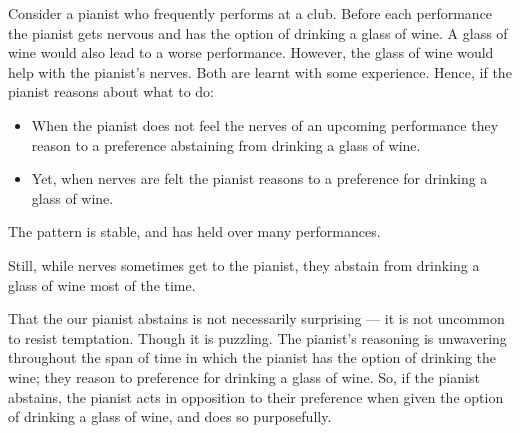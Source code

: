 \begin{note}
  Consider a pianist who frequently performs at a club.
  Before each performance the pianist gets nervous and has the option of drinking a glass of wine.
  A glass of wine would also lead to a worse performance.
  However, the glass of wine would help with the pianist's nerves.
  Both are learnt with some experience.
  Hence, if the pianist reasons about what to do:
  \begin{itemize}
  \item When the pianist does not feel the nerves of an upcoming performance they reason to a preference abstaining from drinking a glass of wine.
  \item Yet, when nerves are felt the pianist reasons to a preference for drinking a glass of wine.
  \end{itemize}
  The pattern is stable, and has held over many performances.

  Still, while nerves sometimes get to the pianist, they abstain from drinking a glass of wine most of the time.

  That the our pianist abstains is not necessarily surprising --- it is not uncommon to resist temptation.
  Though it is puzzling.
  The pianist's reasoning is unwavering throughout the span of time in which the pianist has the option of drinking the wine; they reason to preference for drinking a glass of wine.
  So, if the pianist abstains, the pianist acts in opposition to their preference when given the option of drinking a glass of wine, and does so purposefully.
\end{note}

